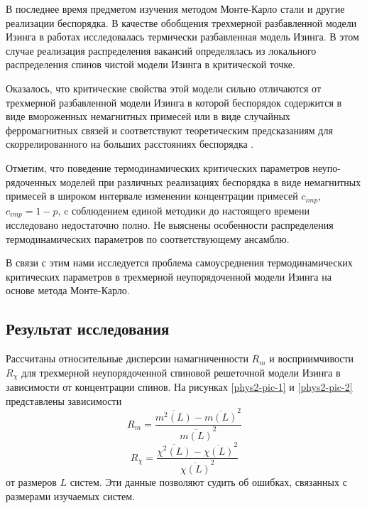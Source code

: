 В последнее время предметом изучения методом Монте-Карло стали и другие реализации беспорядка. В качестве обобщения трехмерной разбавленной модели Изинга в работах \cite{ph2_5,ph2_6} исследовалась термически разбавленная модель Изинга. В этом случае реализация распределения вакансий определялась из локального распределения спинов чистой модели Изинга в критической точке.

Оказалось, что критические свойства этой модели сильно отличаются от трехмерной разбавленной модели Изинга в которой беспорядок содержится в виде вмороженных немагнитных примесей или в виде случайных ферромагнитных связей и соответствуют теоретическим предсказаниям для скоррелированного на больших расстояниях беспорядка \cite{ph2_7}.

Отметим, что поведение термодинамических критических параметров неупо-рядоченных моделей при различных реализациях беспорядка в виде немагнитных примесей в широком интервале изменении концентрации примесей $c_{imp}$, $c_{imp}=1-p$, c соблюдением единой методики до настоящего времени исследовано недостаточно полно. Не выяснены особенности распределения термодинамических параметров по соответствующему ансамблю.

В связи с этим нами исследуется проблема самоусреднения термодинамических критических параметров в трехмерной неупорядоченной модели Изинга на основе метода Монте-Карло.






\subsection{Результат исследования}


Рассчитаны относительные дисперсии намагниченности  $R_m$ и восприимчивости $R_\chi$  для трехмерной неупорядоченной спиновой решеточной модели Изинга в зависимости от концентрации спинов.  На рисунках \ref{phys2-pic-1} и \ref{phys2-pic-2} представлены зависимости
\begin{equation*}
  R_m = \frac{\overline{m^2(L)}-\overline{m(L)}^2}{\overline{m(L)}^2}
\end{equation*}
\begin{equation*}
  R_\chi = \frac{\overline{\chi^2(L)}-\overline{\chi(L)}^2}{\overline{\chi(L)}^2}
\end{equation*}
от размеров $L$ систем. Эти данные позволяют судить об ошибках, связанных с размерами изучаемых систем.




